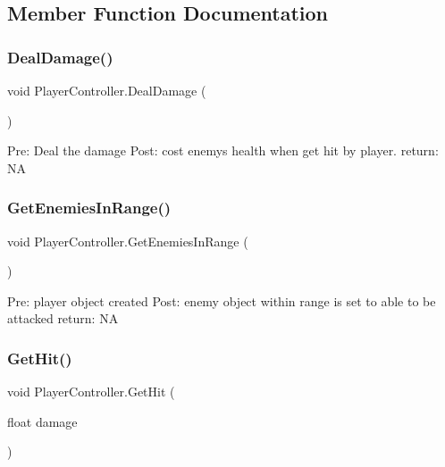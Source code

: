 \subsection{Member Function Documentation}
\mbox{\label{class_player_controller_a2fb25d919a6fbd760c65970976cfa372}} 
\subsubsection{\texorpdfstring{Deal\+Damage()}{DealDamage()}}
{\footnotesize\ttfamily void Player\+Controller.\+Deal\+Damage (\begin{DoxyParamCaption}{ }\end{DoxyParamCaption})\hspace{0.3cm}{\ttfamily [private]}}

Pre\+: Deal the damage Post\+: cost enemy\textquotesingle{}s health when get hit by player. return\+: NA \mbox{\label{class_player_controller_ac3fb6b8e30f4760b402a8f9bea566612}} 
\subsubsection{\texorpdfstring{Get\+Enemies\+In\+Range()}{GetEnemiesInRange()}}
{\footnotesize\ttfamily void Player\+Controller.\+Get\+Enemies\+In\+Range (\begin{DoxyParamCaption}{ }\end{DoxyParamCaption})\hspace{0.3cm}{\ttfamily [private]}}

Pre\+: player object created Post\+: enemy object within range is set to able to be attacked return\+: NA \mbox{\label{class_player_controller_a73a0a3a2d932a17798ab34abd7e885f4}} 
\subsubsection{\texorpdfstring{Get\+Hit()}{GetHit()}}
{\footnotesize\ttfamily void Player\+Controller.\+Get\+Hit (\begin{DoxyParamCaption}\item[{float}]{damage }\end{DoxyParamCaption})}

